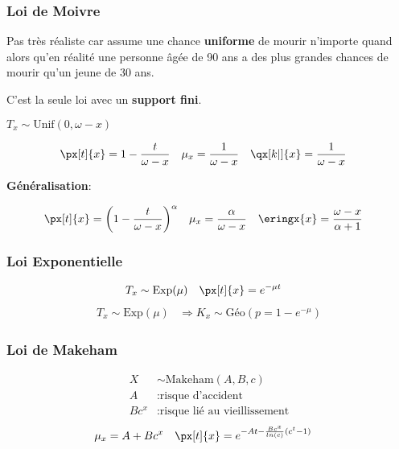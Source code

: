 \documentclass[10pt, french]{article}
\begin{document}
\begin{multicols*}{3}
\subsubsection*{Loi de Moivre}
Pas très réaliste car assume une chance \textbf{uniforme} de mourir n'importe quand alors qu'en réalité une personne âgée de 90 ans a des plus grandes chances de mourir qu'un jeune de 30 ans.
 
C'est la seule loi avec un \textbf{support fini}. 

\begin{center}
$T_x \sim	\text{Unif}(0, \omega - x)$

\begin{align*}
	\px[t]{x} 
		&= 	1 - \frac{t}{\omega - x} &
	\mu_x 
		&=	\frac{1}{\omega - x}	&
	\qx[k |]{x} 
		&=	\frac{1}{\omega - x}
\end{align*}
\end{center}

\textbf{Généralisation}:

\begin{align*}
	\px[t]{x} 
		&= \left( 1 - \frac{t}{\omega - x} \right)^{\alpha} &
	\mu_x &=	\frac{\alpha}{\omega - x}	&
	\eringx{x}	&=	\frac{\omega - x}{\alpha + 1}
\end{align*}

\subsubsection*{Loi Exponentielle}

\begin{center}
\begin{align*}
	T_x 			&\sim 	\mathrm{Exp}(\mu) &
	\px[t]{x} 	&= 		e^{-\mu t}	
\end{align*}
\begin{align*}
	T_x \sim \text{Exp}(\mu) &\Rightarrow K_x \sim \text{Géo}(p = 1 - e^{-\mu}) 
\end{align*}
\end{center}

\subsubsection*{Loi de Makeham}
\begin{align*}
	X &\sim \text{Makeham}(A, B, c) \\
	A &: \text{risque d'accident} \\
	Bc^x &: \text{risque  lié au vieillissement} 
\end{align*}
\begin{align*}
	\mu_x &= A + B c^x &
	\px[t]{x} &= e^{-At - \frac{B c^x}{ln(c)}(c^t - 1)}
\end{align*}
	

\end{multicols*}
\end{document}
